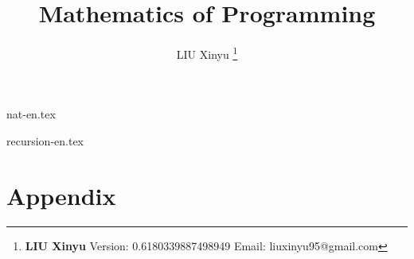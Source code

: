 \documentclass[UTF8, a4paper,twoside]{book} %
\begin{document}


\title{{\bf \Huge Mathematics of Programming}
  \centering
            }

\author{LIU Xinyu
  \thanks{{\bfseries LIU Xinyu} \newline
    Version: 0.6180339887498949 \newline
    Email: liuxinyu95@gmail.com \newline
    }}

\maketitle


\tableofcontents
\newpage

{nat-en.tex}

{recursion-en.tex}



\part{Appendix}
\appendix
\noappendicestocpagenum
\addappheadtotoc



%

\printindex
\end{document}
